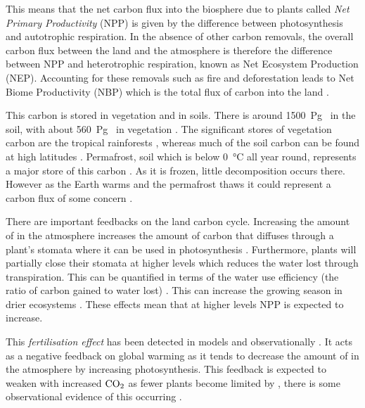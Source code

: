 This means that the net carbon flux into the biosphere due to plants called \emph{Net Primary Productivity} (NPP) is given by the difference between photosynthesis and
autotrophic respiration. In the absence of other carbon removals, the overall carbon flux between the land and the atmosphere is therefore the
difference between NPP and heterotrophic respiration, known as Net Ecosystem Production (NEP). Accounting for these removals such as fire and deforestation leads to
Net Biome Productivity (NBP) which is the total flux of carbon into the land \parencite{Lovett2006,Fernandez-Martinez2023}. 

This carbon is stored in vegetation and in soils. There is around \SI{1500}{\peta\gram\carbon} in the soil, with about \SI{560}{\peta\gram\carbon} in vegetation \parencite{Crowther2019}.
The significant stores of vegetation carbon are the tropical rainforests \parencite{Malhi2006}, whereas much of the soil carbon can be found at high latitudes \parencite{Varney2020}.
Permafrost, soil which is below \SI{0}{\degreeCelsius} all year round, represents a major store of this carbon \parencite{Hugelius2014}. As it is frozen, little decomposition occurs there.
However as the Earth warms and the permafrost thaws it could represent a carbon flux of some concern \parencite{Schuur2015}.


There are important feedbacks on the land carbon cycle.
Increasing the amount of  in the atmosphere increases the amount of carbon that diffuses through a plant's stomata where it can be used in photosynthesis \parencite{Farquhar1980}.
Furthermore, plants will partially close their stomata at higher  levels \parencite{DeKauwe2013} which reduces the water lost through transpiration. This can be quantified in terms of the
water use efficiency (the ratio of carbon gained to water lost) \parencite{Drake1997}. This can increase the growing season in drier ecosystems \parencite{Frank2015}.
These effects mean that at higher  levels NPP is expected to increase.

This \emph{ fertilisation effect} has been detected in models \parencite{Friedlingstein2006,Arora2020,Wenzel2016} and observationally \parencite{Ainsworth2007,KolbySmith2016}.
It acts as a negative feedback on global warming as it tends to decrease the amount of  in the atmosphere by increasing photosynthesis. This feedback is
expected to weaken with increased $\ce{CO2}$ as fewer plants become limited by , there is some observational evidence of this occurring \parencite{Wang2020}.

